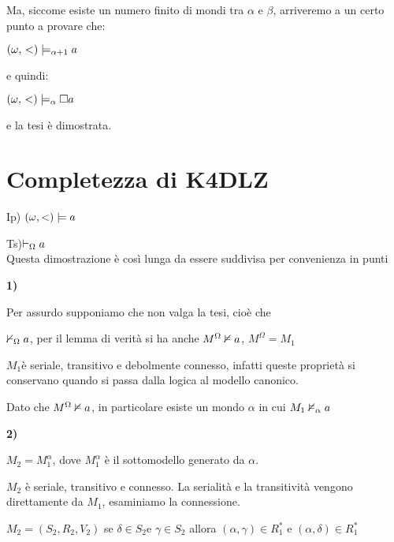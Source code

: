 Ma, siccome esiste un numero finito di mondi tra $\alpha$ e $\beta$,
arriveremo a un certo punto a provare che:

$(\omega,\,<)\models_{\alpha+1}a$

e quindi:

$(\omega,\,<)\models_{\alpha}\square a$

\begin{center} 
\end{center}

e la tesi è dimostrata.


\section{Completezza di K4DLZ}

Ip) $(\omega,<)\models a$

Ts)$\vdash_{\Omega}a$ \\


Questa dimostrazione è così lunga da essere suddivisa per convenienza
in punti

\textbf{1)}

Per assurdo supponiamo che non valga la tesi, cioè che 

$\nvdash_{\Omega}a$, per il lemma di verità si ha anche $M^{\Omega}\nvDash a$,
$M^{\Omega}=M_{1}$

$M_{1}$è seriale, transitivo e debolmente connesso, infatti queste
proprietà si conservano quando si passa dalla logica al modello canonico.

Dato che $M^{\Omega}\nvDash a$, in particolare esiste un mondo
$\alpha$ in cui $M_{1}\nvDash_{\alpha}a$

\textbf{2)}

$M_{2}=M_{1}^{\alpha}$, dove $M_{1}^{\alpha}$ è il sottomodello
generato da $\alpha$.

$M_{2}$ è seriale, transitivo e connesso. La serialità e la transitività
vengono direttamente da $M_{1}$, esaminiamo la connessione.

$M_{2}=(S_{2},R_{2},V_{2})$ se $\delta\in S_{2}$e $\gamma\in S_{2}$
allora $(\alpha,\gamma)\in R_{1}^{*}$ e $(\alpha,\delta)\in R_{1}^{*}$

